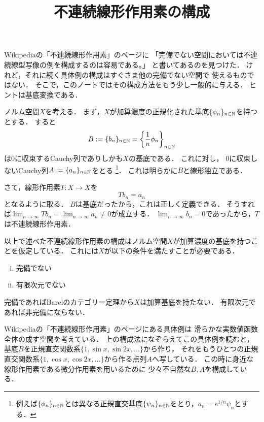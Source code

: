 \documentclass[a4j]{jarticle}
\title{不連続線形作用素の構成}
\begin{document}
\maketitle
Wikipediaの「不連続線形作用素」のページに
「完備でない空間においては不連続線型写像の例を構成するのは容易である。」
と書いてあるのを見つけた．
けれど，それに続く具体例の構成はすぐさま他の完備でない空間で
使えるものではない．
そこで，このノートではその構成方法をもう少し一般的に与える．
ヒントは基底変換である．

ノルム空間$X$を考える．
まず，$X$が加算濃度の正規化された基底$\{ \phi_n \}_{n \in \mathbb{N}}$を持つとする．
すると
\[ B:=\{b_n\}_{n \in \mathbb{N}}=\left\{\frac{1}{n} \phi_n \right\}_{n \in \mathbb{N}} \]
は0に収束するCauchy列でありしかも$X$の基底である．
これに対し，
0に収束しないCauchy列$A:=\{ a_n \}_{n \in \mathbb{N}}$をとる
\footnote{例えば$\{ \phi_n \}_{n \in \mathbb{N}}$とは異なる正規直交基底$\{ \psi_n \}_{n \in \mathbb{N}}$をとり，$a_n=e^{1/n} \psi_n$とする．}．
これは明らかに$B$と線形独立である．

さて，線形作用素$T:X \to X$を
\[ Tb_n=a_n \]
となるように取る．
$B$は基底だったから，これは正しく定義できる．
そうすれば$\lim_{n \to \infty} Tb_n=\lim_{n \to \infty} a_n \neq 0$が成立する．
$\lim_{n \to \infty} b_n=0$であったから，$T$は不連続線形作用素．

以上で述べた不連続線形作用素の構成はノルム空間$X$が加算濃度の基底を持つことを仮定している．
これには$X$が以下の条件を満たすことが必要である．
\begin{enumerate}[i)]
    \item 完備でない
    \item 有限次元でない
\end{enumerate}
完備であればBarelのカテゴリー定理から$X$は加算基底を持たない．
有限次元であれば非完備にならない．

Wikipediaの「不連続線形作用素」のページにある具体例は
滑らかな実数値函数全体の成す空間を考えている．
上の構成法になぞらえてこの具体例を読むと，
基底$B$を正規直交関数系$\{ 1, \sin x, \sin 2x, \dots \}$から作り，
それをもうひとつの正規直交関数系$\{ 1, \cos x, \cos 2x, \dots \}$から作る点列$A$へ写している．
この時に身近な線形作用素である微分作用素を用いるために
少々不自然な$B,A$を構成している．
\end{document}
